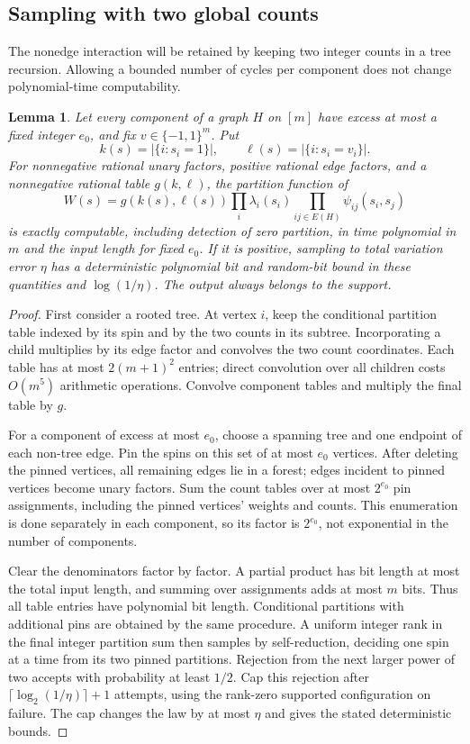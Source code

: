 \documentclass[11pt]{article}
\newtheorem{lemma}[thm]{Lemma}
\numberwithin{equation}{section}
\begin{document}
\subsection{Sampling with two global counts}

The nonedge interaction will be retained by keeping two integer counts in a tree recursion. Allowing a bounded number of cycles per component does not change polynomial-time computability.

\begin{lemma}\label{ref:counts}
Let every component of a graph $H$ on $[m]$ have excess at most a fixed integer $e_0$, and fix $v\in\{-1,1\}^m$. Put
\[
 k(s)=|\{i:s_i=1\}|,\qquad \ell(s)=|\{i:s_i=v_i\}|.
\]
For nonnegative rational unary factors, positive rational edge factors, and a nonnegative rational table $g(k,\ell)$, the partition function of
\[
 W(s)=g(k(s),\ell(s))\prod_i\lambda_i(s_i)
                         \prod_{ij\in E(H)}\psi_{ij}(s_i,s_j)
\]
is exactly computable, including detection of zero partition, in time polynomial in $m$ and the input length for fixed $e_0$. If it is positive, sampling to total variation error $\eta$ has a deterministic polynomial bit and random-bit bound in these quantities and $\log(1/\eta)$. The output always belongs to the support.
\end{lemma}

\begin{proof}
First consider a rooted tree. At vertex $i$, keep the conditional partition table indexed by its spin and by the two counts in its subtree. Incorporating a child multiplies by its edge factor and convolves the two count coordinates. Each table has at most $2(m+1)^2$ entries; direct convolution over all children costs $O(m^5)$ arithmetic operations. Convolve component tables and multiply the final table by $g$.

For a component of excess at most $e_0$, choose a spanning tree and one endpoint of each non-tree edge. Pin the spins on this set of at most $e_0$ vertices. After deleting the pinned vertices, all remaining edges lie in a forest; edges incident to pinned vertices become unary factors. Sum the count tables over at most $2^{e_0}$ pin assignments, including the pinned vertices' weights and counts. This enumeration is done separately in each component, so its factor is $2^{e_0}$, not exponential in the number of components.

Clear the denominators factor by factor. A partial product has bit length at most the total input length, and summing over assignments adds at most $m$ bits. Thus all table entries have polynomial bit length. Conditional partitions with additional pins are obtained by the same procedure. A uniform integer rank in the final integer partition sum then samples by self-reduction, deciding one spin at a time from its two pinned partitions. Rejection from the next larger power of two accepts with probability at least $1/2$. Cap this rejection after $\lceil\log_2(1/\eta)\rceil+1$ attempts, using the rank-zero supported configuration on failure. The cap changes the law by at most $\eta$ and gives the stated deterministic bounds.
\end{proof}
\end{document}

